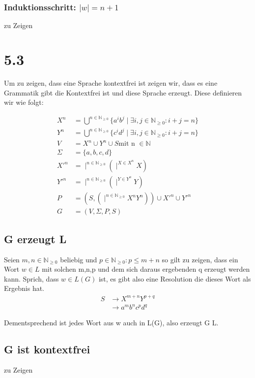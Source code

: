 \documentclass[12pt, a4paper]{article}
\begin{document}
\subsubsection*{Induktionsschritt: $\mid w \mid = n + 1$}
zu Zeigen

\section*{5.3}
Um zu zeigen, dass eine Sprache kontextfrei ist zeigen wir, dass es eine Grammatik gibt die Kontextfrei ist und diese Sprache erzeugt.
Diese definieren wir wie folgt:

\begin{align*}
X^n &= \bigcup^{n \in \mathbb{N}_{\ge 0}} \{a^i b^j \mid \exists i,j \in \mathbb{N}_{\ge 0}: i + j = n \} \\
Y^n &= \bigcup^{n \in \mathbb{N}_{\ge 0}} \{c^i d^j \mid \exists i,j \in \mathbb{N}_{\ge 0}: i + j = n \} \\
V &= X^n \cup Y^n \cup S \text{mit n } \in \mathbb{N} \\
\Sigma &= \{ a,b,c,d \} \\
X'^n &= \mid^{n \in \mathbb{N}_{\ge 0}} (\mid^{X \in X^n} X) \\
Y'^n &= \mid^{n \in \mathbb{N}_{\ge 0}} (\mid^{Y \in Y^n} Y) \\
P &= (S , (\mid^{n \in \mathbb{N}_{\ge 0}} X^n Y^n)) \cup X'^n \cup Y'^n \\
G &= (V, \Sigma, P, S)
\end{align*}

\subsection*{G erzeugt L}
Seien $m,n \in \mathbb{N}_{\ge 0}$ beliebig und $p \in \mathbb{N}_{\ge 0}: p \le m+n$ so gilt zu zeigen, dass ein Wort $w \in L$ mit solchen m,n,p und dem sich daraus ergebenden q erzeugt werden kann. Sprich, dass $w \in L(G)$ ist, es gibt also eine Resolution die dieses Wort als Ergebnis hat.
\begin{align*}
S &\rightarrow X^{m+n} Y^{p+q} \\
&\rightarrow a^m b^n c^p d^q
\end{align*}

Dementsprechend ist jedes Wort aus w auch in L(G), also erzeugt G L.
\subsection*{G ist kontextfrei}
zu Zeigen
\end{document}
